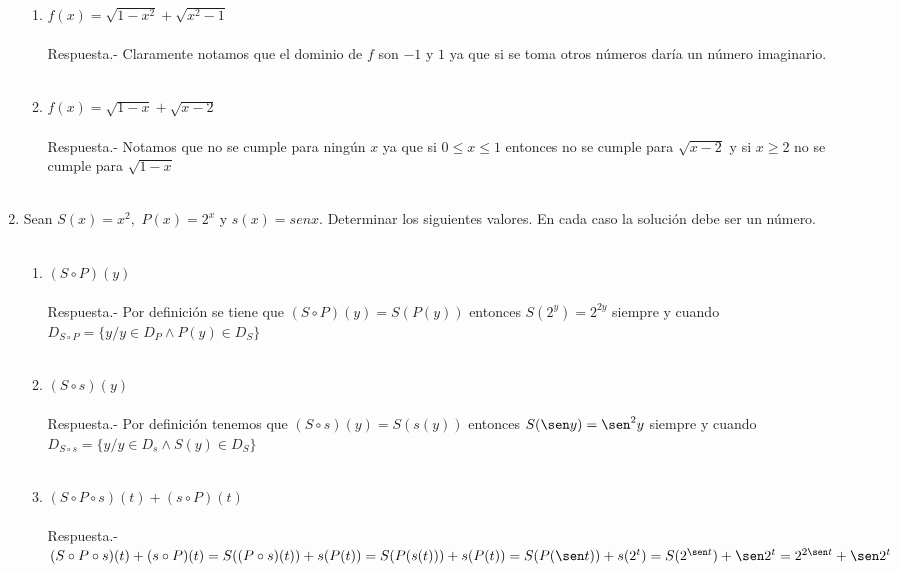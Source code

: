 \begin{enumerate}
\begin{enumerate}[\bfseries (i)]
	    \item $f(x)=\sqrt{1-x^2} + \sqrt{x^2-1}$\\\\
	    Respuesta.- \; Claramente notamos que el dominio de $f$ son $-1$ y $1$ ya que si se toma otros números daría un número imaginario.\\\\

	    \item $f(x)=\sqrt{1-x}+\sqrt{x-2}$\\\\
	    Respuesta.- \; Notamos que no se cumple para ningún $x$ ya que si $0\leq x \leq 1$ entonces no se cumple para $\sqrt{x-2} $ y si $x\geq 2$ no se cumple para $\sqrt{1-x}$\\\\ 

	    \end{enumerate}

	\item Sean $S(x)=x^2,$ $P(x)=2^x$ y $s(x)=sen x$. Determinar los siguientes valores. En cada caso la solución debe ser un número.\\\\

	\begin{enumerate}[\bfseries (i)]

	    \item $(S \circ P)(y)$\\\\
	    Respuesta.- \; Por definición se tiene que $(S \circ P)(y)=S(P(y))$ entonces $S(2^y)=2^{2y}$ siempre y cuando $D_{S \circ P}=\lbrace y / y \in D_P \land P(y) \in D_S\rbrace$\\\\
	    
	    \item $(S \circ s)(y)$\\\\
	    Respuesta.- \; Por definición tenemos que $(S \circ s)(y)=S(s(y))$ entonces $S(\sen y)=\sen^2 y$ siempre y cuando $D_{S \circ s}=\lbrace y / y \in D_s \land S(y) \in D_S \rbrace$\\\\

	    \item $(S \circ P \circ s)(t)+(s \circ P)(t)$\\\\
	    Respuesta.- \; $(S \circ P \circ s)(t)+(s \circ P)(t) = S((P \circ s)(t))+s(P(t)) = S(P(s(t))) + s(P(t))=S(P(\sen t)) + s(2^t)=S(2^{\sen t}) +  \sen 2^t = 2^{2 \sen t} +\sen 2^t$\\\\  


\end{enumerate}
\end{enumerate}
